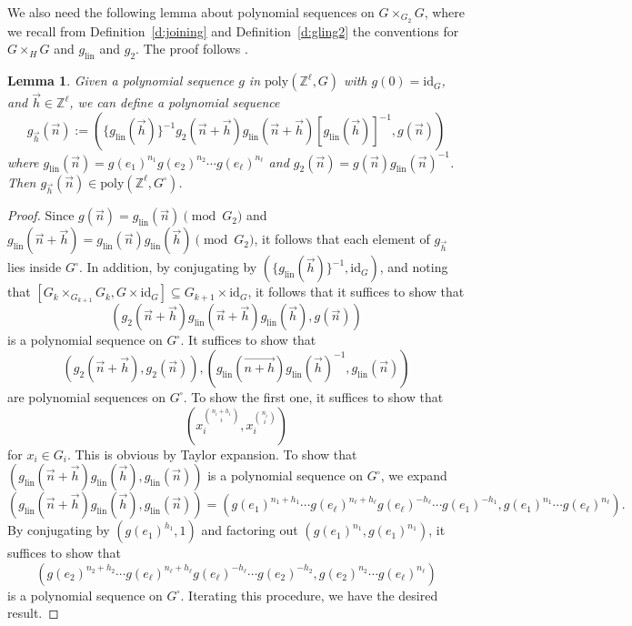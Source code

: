 \documentclass[11pt, a4paper]{amsart}
\theoremstyle{plain}
\theoremstyle{plain}
\newtheorem{lemma}{Lemma}
\theoremstyle{definition}
\theoremstyle{remark}
\numberwithin{equation}{section}
\numberwithin{lemma}{section}
\numberwithin{proposition}{section}
\numberwithin{corollary}{section}
\numberwithin{definition}{section}
\numberwithin{claim}{section}
\begin{document}
We also need the following lemma about polynomial sequences on $G \times_{G_2} G$, where we recall from Definition~\ref{d:joining} and Definition~\ref{d:gling2} the conventions for $G \times_H G$ and $g_{\mathrm{lin}}$ and $g_2$. The proof follows \cite[Proposition 4.2]{GT14}.
\begin{lemma}\label{l:vandercorputpolynomial}
Given a polynomial sequence $g$ in $\mathrm{poly}(\mathbb{Z}^\ell, G)$ with $g(0) = \mathrm{id}_G$, and $\vec{h} \in \mathbb{Z}^\ell$, we can define a polynomial sequence
$$g_{\vec{h}}(\vec{n}) := (\{g_{\mathrm{lin}}(\vec{h})\}^{-1}g_2(\vec{n} + \vec{h})g_{\mathrm{lin}}(\vec{n} + \vec{h})[g_{\mathrm{lin}}(\vec{h})]^{-1}, g(\vec{n}))$$
where $g_{\mathrm{lin}}(\vec{n}) = g(e_1)^{n_1}g(e_2)^{n_2} \cdots g(e_\ell)^{n_\ell}$ and $g_2(\vec{n}) = g(\vec{n})g_{\mathrm{lin}}(\vec{n})^{-1}$. Then $g_{\vec{h}}(\vec{n}) \in \mathrm{poly}(\mathbb{Z}^\ell, G^\square)$. 
\end{lemma}
\begin{proof}
Since $g(\vec{n}) = g_{\mathrm{lin}}(\vec{n}) \pmod{G_2}$ and $g_{\mathrm{lin}}(\vec{n} + \vec{h}) = g_{\mathrm{lin}}(\vec{n})g_{\mathrm{lin}}(\vec{h}) \pmod{G_2}$, it follows that each element of $g_{\vec{h}}$ lies inside $G^\square$. In addition, by conjugating by $(\{g_{\mathrm{lin}}(\vec{h})\}^{-1}, \mathrm{id}_G)$, and noting that $[G_k \times_{G_{k + 1}} G_k, G \times \mathrm{id}_G] \subseteq G_{k + 1} \times \mathrm{id}_G$, it follows that it suffices to show that
$$(g_2(\vec{n} + \vec{h})g_{\mathrm{lin}}(\vec{n} + \vec{h})g_{\mathrm{lin}}(\vec{h}), g(\vec{n}))$$
is a polynomial sequence on $G^\square$. It suffices to show that
$$(g_2(\vec{n} + \vec{h}), g_2(\vec{n})), (g_{\mathrm{lin}}(\vec{n + h}) g_{\mathrm{lin}}(\vec{h})^{-1}, g_{\mathrm{lin}}(\vec{n}))$$
are polynomial sequences on $G^\square$. To show the first one, it suffices to show that
$$(x_i^{\binom{n_i + h_i}{i}}, x_i^{\binom{n_i}{i}})$$
for $x_i \in G_i$. This is obvious by Taylor expansion. To show that $(g_{\mathrm{lin}}(\vec{n} + \vec{h}) g_{\mathrm{lin}}(\vec{h}), g_{\mathrm{lin}}(\vec{n}))$ is a polynomial sequence on $G^\square$, we expand
$$(g_{\mathrm{lin}}(\vec{n} + \vec{h}) g_{\mathrm{lin}}(\vec{h}), g_{\mathrm{lin}}(\vec{n})) = (g(e_1)^{n_1 + h_1} \cdots g(e_\ell)^{n_\ell + h_\ell} g(e_\ell)^{-h_\ell} \cdots g(e_1)^{-h_1}, g(e_1)^{n_1} \cdots g(e_\ell)^{n_\ell}).$$
By conjugating by $(g(e_1)^{h_1}, 1)$ and factoring out $(g(e_1)^{n_1}, g(e_1)^{n_1})$, it suffices to show that
$$(g(e_2)^{n_2 + h_2} \cdots g(e_\ell)^{n_\ell + h_\ell} g(e_\ell)^{-h_\ell} \cdots g(e_2)^{-h_2}, g(e_2)^{n_2} \cdots g(e_\ell)^{n_\ell})$$
is a polynomial sequence on $G^\square$. Iterating this procedure, we have the desired result.
\end{proof}
\end{document}
